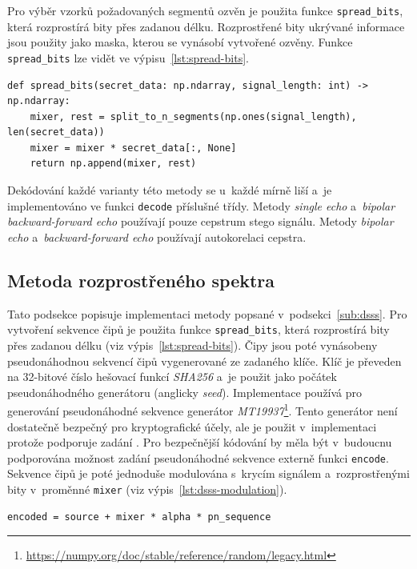 Pro výběr vzorků požadovaných segmentů ozvěn je použita funkce
\texttt{spread\_bits}, která rozprostírá bity přes zadanou délku. Rozprostřené
bity ukrývané informace jsou použity jako maska, kterou se vynásobí vytvořené
ozvěny. Funkce \texttt{spread\_bits} lze vidět ve výpisu~\ref{lst:spread-bits}.

\begin{lstlisting}[language=PythonPlus, label={lst:spread-bits},
caption={Funkce pro rozprostření bitů na zadanou délku.}]
def spread_bits(secret_data: np.ndarray, signal_length: int) -> np.ndarray:
    mixer, rest = split_to_n_segments(np.ones(signal_length), len(secret_data))
    mixer = mixer * secret_data[:, None]
    return np.append(mixer, rest)
\end{lstlisting}

Dekódování každé varianty této metody se u~každé mírně liší a~je implementováno
ve funkci \texttt{decode} příslušné třídy. Metody \textit{single echo}
a~\textit{bipolar backward-forward echo} používají pouze cepstrum stego
signálu. Metody \textit{bipolar echo} a~\textit{backward-forward echo}
používají autokorelaci cepstra.

\subsection*{Metoda rozprostřeného spektra}
\label{sub:dsss-implementation}

Tato podsekce popisuje implementaci metody popsané v~podsekci~\ref{sub:dsss}.
Pro vytvoření sekvence čipů je použita funkce \texttt{spread\_bits}, která
rozprostírá bity přes zadanou délku (viz výpis~\ref{lst:spread-bits}). Čipy
jsou poté vynásobeny pseudonáhodnou sekvencí čipů vygenerované ze zadaného
klíče. Klíč je převeden na 32-bitové číslo hešovací funkcí \textit{SHA256} a~je
použit jako počátek pseudonáhodného generátoru (anglicky \textit{seed}).
Implementace používá pro generování pseudonáhodné sekvence generátor
\textit{MT19937}\footnote{\url{https://numpy.org/doc/stable/reference/random/legacy.html}}.
Tento generátor není dostatečně bezpečný pro kryptografické účely, ale je
použit v~implementaci protože podporuje zadání . Pro bezpečnější
kódování by měla být v~budoucnu podporována možnost zadání pseudonáhodné
sekvence externě funkci \texttt{encode}. Sekvence čipů je poté jednoduše
modulována s~krycím signálem a~rozprostřenými bity v~proměnné \texttt{mixer}
(viz výpis~\ref{lst:dsss-modulation}).

\begin{lstlisting}[language=PythonPlus, label={lst:dsss-modulation},
caption={Modulace krycího signálu, rozprostřených bitů a~pseudonáhodné sekvence
čipů.}]
encoded = source + mixer * alpha * pn_sequence
\end{lstlisting}

